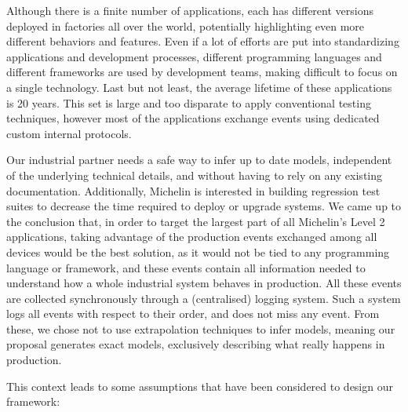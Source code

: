 Although there is a finite number of applications, each has
different versions deployed in factories all over the world,
potentially highlighting even more different behaviors and
features. Even if a lot of efforts are put into standardizing
applications and development processes, different programming
languages and different frameworks are used by development
teams, making difficult to focus on a single technology. Last
but not least, the average lifetime of these applications is 20
years. This set is large and too disparate to apply conventional
testing techniques, however most of the applications exchange
events using dedicated custom internal protocols.

Our industrial partner needs a safe way to infer up to date
models, independent of the underlying technical details, and
without having to rely on any existing documentation.
Additionally, Michelin is interested in building regression test
suites to decrease the time required to deploy or upgrade
systems. We came up to the conclusion that, in order to target
the largest part of all Michelin's Level 2 applications, taking
advantage of the production events exchanged among all devices
would be the best solution, as it would not be tied to any
programming language or framework, and these events contain all
information needed to understand how a whole industrial system
behaves in production. All these events are collected
synchronously through a (centralised) logging system. Such a
system logs all events with respect to their order, and does not
miss any event.  From these, we chose not to use extrapolation
techniques to infer models, meaning our proposal generates exact
models, exclusively describing what really happens in production.

This context leads to some assumptions that have been considered
to design our framework:

